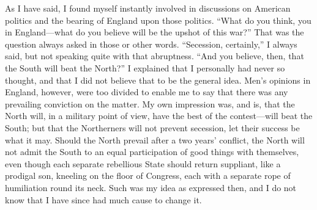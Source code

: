 As I have said, I found myself instantly involved in discussions on
American politics and the bearing of England upon those politics.
``What do you think, you in England---what do you believe will be the
upshot of this war?''  That was the question always asked in those
or other words.  ``Secession, certainly,'' I always said, but not
speaking quite with that abruptness.  ``And you believe, then, that
the South will beat the North?''  I explained that I personally had
never so thought, and that I did not believe that to be the general
idea.  Men's opinions in England, however, were too divided to
enable me to say that there was any prevailing conviction on the
matter.  My own impression was, and is, that the North will, in a
military point of view, have the best of the contest---will beat the
South; but that the Northerners will not prevent secession, let
their success be what it may.  Should the North prevail after a two
years' conflict, the North will not admit the South to an equal
participation of good things with themselves, even though each
separate rebellious State should return suppliant, like a prodigal
son, kneeling on the floor of Congress, each with a separate rope
of humiliation round its neck.  Such was my idea as expressed then,
and I do not know that I have since had much cause to change it.

